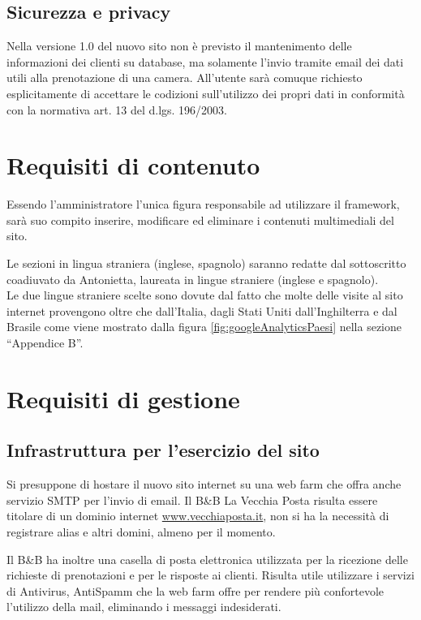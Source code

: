 \documentclass[a4paper,12pt,hidelinks]{report}
\begin{document}
  \subsection{Sicurezza e privacy}
    Nella versione 1.0 del nuovo sito non è previsto il mantenimento delle informazioni dei clienti su database, ma solamente l'invio tramite email dei dati utili alla prenotazione di una camera.
    All'utente sarà comuque richiesto esplicitamente di accettare le codizioni sull'utilizzo dei propri dati in conformità con la normativa art. 13 del d.lgs. 196/2003.

\section{Requisiti di contenuto}
  Essendo l'amministratore l'unica figura responsabile ad utilizzare il framework, sarà suo compito inserire, modificare ed eliminare i contenuti multimediali del sito.
  \par Le sezioni in lingua straniera (inglese, spagnolo) saranno redatte dal sottoscritto coadiuvato da Antonietta, laureata in lingue straniere (inglese e spagnolo).
  \\Le due lingue straniere scelte sono dovute dal fatto che molte delle visite al sito internet provengono oltre che dall'Italia, dagli Stati Uniti dall'Inghilterra e dal Brasile 
  come viene mostrato dalla figura \ref{fig:googleAnalyticsPaesi} nella sezione ``Appendice B''.

\section{Requisiti di gestione}

  \subsection{Infrastruttura per l'esercizio del sito}
    Si presuppone di hostare il nuovo sito internet su una web farm che offra anche servizio SMTP per l'invio di email. 
    Il B\&B La Vecchia Posta risulta essere titolare di un dominio internet \url{www.vecchiaposta.it},
    non si ha la necessità di registrare alias e altri domini, almeno per il momento.
    \par Il B\&B ha inoltre una casella di posta elettronica utilizzata per la ricezione delle richieste di prenotazioni e per le risposte ai clienti. 
    Risulta utile utilizzare i servizi di Antivirus, AntiSpamm che la web farm offre per rendere più confortevole l'utilizzo della mail, eliminando i 
    messaggi indesiderati.
    
\end{document}
